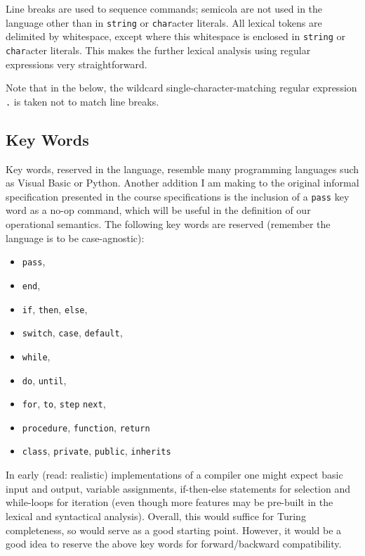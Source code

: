 \documentclass{article}
\newcommand{\code}[1]{\colorbox{gray!20}{\texttt{#1}}}
\begin{document}
    Line breaks are used to sequence commands; semicola are not used in the language other than in \code{string} or \code{char}acter literals. 
    All lexical tokens are delimited by whitespace, except where this whitespace is enclosed in \code{string} or \code{char}acter literals. This makes the further lexical analysis using regular expressions very straightforward.

    Note that in the below, the wildcard single-character-matching regular expression \code{.} is taken not to match line breaks.

    \subsection{Key Words}
    Key words, reserved in the language, resemble many programming languages such as Visual Basic or Python. Another addition I am making to the original informal specification presented in the course specifications is the inclusion of a \code{pass} key word as a no-op command, which will be useful in the definition of our operational semantics. The following key words are reserved (remember the language is to be case-agnostic):
    \begin{itemize}
        \item \code{pass},
        \item \code{end},
        \item \code{if}, \code{then}, \code{else},
        \item \code{switch}, \code{case}, \code{default},
        \item \code{while},
        \item \code{do}, \code{until},
        \item \code{for}, \code{to}, \code{step} \code{next},
        \item \code{procedure}, \code{function}, \code{return}
        \item \code{class}, \code{private}, \code{public}, \code{inherits}
    \end{itemize}

    In early (read: realistic) implementations of a compiler one might expect basic input and output, variable assignments, if-then-else statements for selection and while-loops for iteration (even though more features may be pre-built in the lexical and syntactical analysis). Overall, this would suffice for Turing completeness, so would serve as a good starting point. However, it would be a good idea to reserve the above key words for forward/backward compatibility. 
\end{document}
